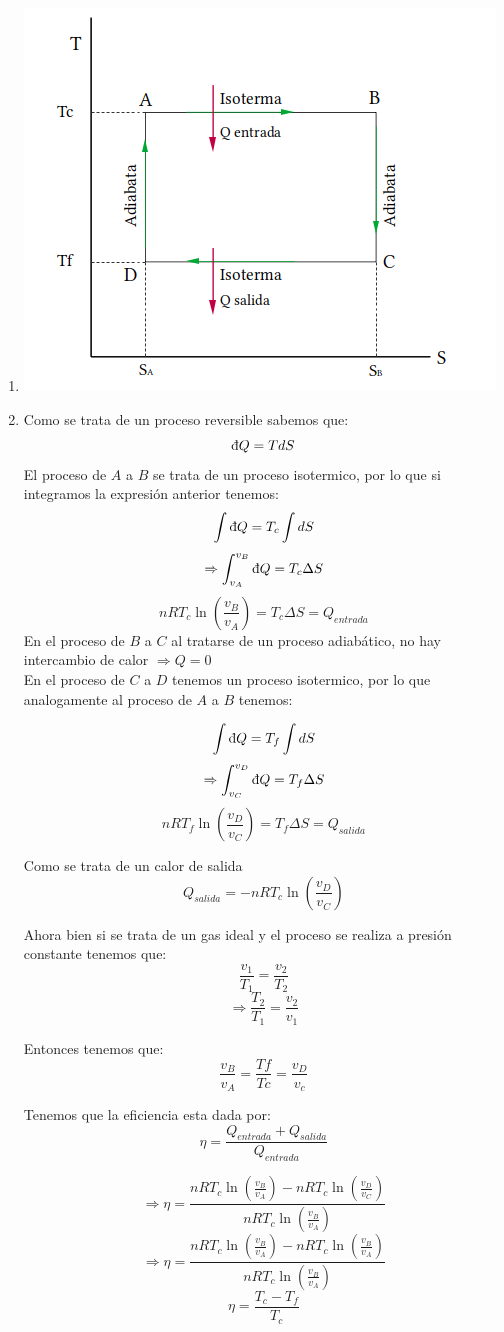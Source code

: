 \begin{enumerate}
    \item  \includegraphics*[H]{T-S.png}
    \item  Como se trata de un proceso reversible  sabemos que:
    \[ \dbar Q =TdS \]
   El proceso de $A$ a $B$ se trata de un proceso isotermico, por lo que si integramos la expresión anterior tenemos:
   \[ \int \dbar Q =T_{c}\int dS \]
   \[ \Rightarrow \int _{v_A} ^{v_B} \dbar Q = T_{c} \Delta S\]
   \[nRT_c \ln \left( \frac{v_B}{v_A}\right) = T_{c}\Delta S = Q_{entrada}\]
    En el proceso de $B$ a $C$ al tratarse de un proceso adiabático, no hay intercambio de calor $\Rightarrow Q=0$\\

    En  el proceso de $C$ a $D$ tenemos un proceso isotermico, por lo que analogamente al proceso de $A$ a $B$ tenemos:

\[ \int \dbar Q =T_{f}\int dS \]
   \[ \Rightarrow \int _{v_C} ^{v_D} \dbar Q = T_{f} \Delta S\]
   \[nRT_f \ln \left( \frac{v_D}{v_C}\right) = T_{f}\Delta S = Q_{salida}\]

Como se trata de un calor de salida 
\[Q_{salida}=-nRT_c \ln \left( \frac{v_D}{v_C}\right)\]
  

   Ahora bien si  se trata de un gas ideal y el proceso se realiza a presión constante tenemos que:
   \[ \frac{v_1}{T_1}=\frac{v_2}{T_2}\]
   \[\Rightarrow \frac{T_2}{T_1}=\frac{v_2}{v_1}\]

Entonces tenemos que:
\[ \frac{v_B}{v_A}=\frac{Tf}{Tc}=\frac{v_D}{v_c}\]

Tenemos que la eficiencia esta dada por:
\[ \eta = \frac{Q_{entrada}+ Q_{salida}}{Q_{entrada}}\]

\[\Rightarrow  \eta = \frac{nRT_c \ln \left( \frac{v_B}{v_A}\right)-nRT_c \ln \left( \frac{v_D}{v_C}\right)}{nRT_c \ln \left( \frac{v_B}{v_A}\right)}\]
\[\Rightarrow  \eta = \frac{nRT_c \ln \left( \frac{v_B}{v_A}\right)-nRT_c \ln \left( \frac{v_B}{v_A}\right)}{nRT_c \ln \left( \frac{v_B}{v_A}\right)}\]
\[\eta =\frac{T_c-T_f}{T_c}\]





\end{enumerate}
